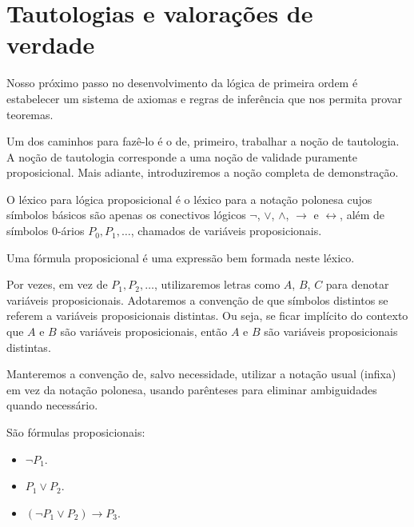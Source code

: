 \section{Tautologias e valorações de verdade}\label{sec:tautologiasEValoracoes}
Nosso próximo passo no desenvolvimento da lógica de primeira ordem é estabelecer um sistema de axiomas e regras de inferência que nos permita provar teoremas.

Um dos caminhos para fazê-lo é o de, primeiro, trabalhar a noção de tautologia.
A noção de tautologia corresponde a uma noção de validade puramente proposicional.
Mais adiante, introduziremos a noção completa de demonstração.

\begin{metadefinition}\label{mdef:formulasProposicionais}
    O léxico para lógica proposicional é o léxico para a notação polonesa cujos símbolos básicos são apenas os conectivos lógicos $\neg$, $\vee$, $\wedge$, $\rightarrow$ e $\leftrightarrow$, além de símbolos $0$-ários $P_0, P_1, \dots$, chamados de variáveis proposicionais.

    Uma fórmula proposicional é uma expressão bem formada neste léxico.
\end{metadefinition}

Por vezes, em vez de $P_1, P_2, \dots$, utilizaremos letras como $A$, $B$, $C$ para denotar variáveis proposicionais.
Adotaremos a convenção de que símbolos distintos se referem a variáveis proposicionais distintas.
Ou seja, se ficar implícito do contexto que $A$ e $B$ são variáveis proposicionais, então $A$ e $B$ são variáveis proposicionais distintas.

Manteremos a convenção de, salvo necessidade, utilizar a notação usual (infixa) em vez da notação polonesa, usando parênteses para eliminar ambiguidades quando necessário.

\begin{example}\label{exa:formulasProposicionais}
    São fórmulas proposicionais:
    \begin{itemize}
        \item $\neg P_1$.
        \item $P_1 \vee P_2$.
        \item $(\neg P_1 \vee P_2) \rightarrow P_3$.
    \end{itemize}
\end{example}


